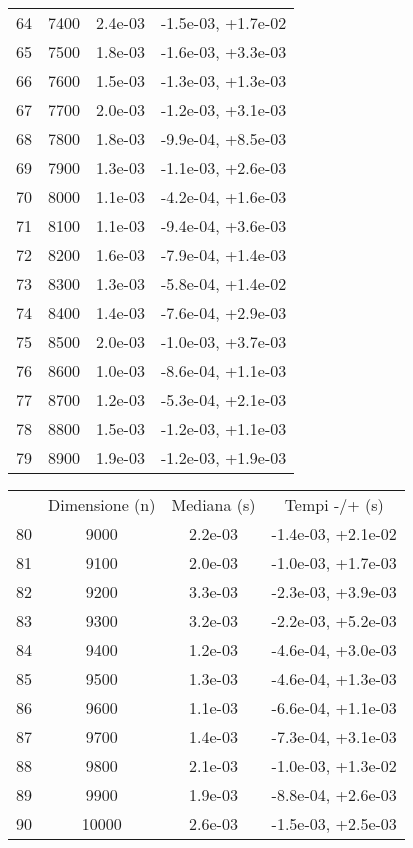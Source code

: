 \begin{table}
\begin{adjustbox}{width=1\textwidth/2}
\begin{tabular}{|c|c|c|c|}
\cline{1-4}
64 & 7400 & 2.4e-03 & -1.5e-03, +1.7e-02 \\
\cline{1-4}
65 & 7500 & 1.8e-03 & -1.6e-03, +3.3e-03 \\
\cline{1-4}
66 & 7600 & 1.5e-03 & -1.3e-03, +1.3e-03 \\
\cline{1-4}
67 & 7700 & 2.0e-03 & -1.2e-03, +3.1e-03 \\
\cline{1-4}
68 & 7800 & 1.8e-03 & -9.9e-04, +8.5e-03 \\
\cline{1-4}
69 & 7900 & 1.3e-03 & -1.1e-03, +2.6e-03 \\
\cline{1-4}
70 & 8000 & 1.1e-03 & -4.2e-04, +1.6e-03 \\
\cline{1-4}
71 & 8100 & 1.1e-03 & -9.4e-04, +3.6e-03 \\
\cline{1-4}
72 & 8200 & 1.6e-03 & -7.9e-04, +1.4e-03 \\
\cline{1-4}
73 & 8300 & 1.3e-03 & -5.8e-04, +1.4e-02 \\
\cline{1-4}
74 & 8400 & 1.4e-03 & -7.6e-04, +2.9e-03 \\
\cline{1-4}
75 & 8500 & 2.0e-03 & -1.0e-03, +3.7e-03 \\
\cline{1-4}
76 & 8600 & 1.0e-03 & -8.6e-04, +1.1e-03 \\
\cline{1-4}
77 & 8700 & 1.2e-03 & -5.3e-04, +2.1e-03 \\
\cline{1-4}
78 & 8800 & 1.5e-03 & -1.2e-03, +1.1e-03 \\
\cline{1-4}
79 & 8900 & 1.9e-03 & -1.2e-03, +1.9e-03 \\
\cline{1-4}
\end{tabular}
\end{adjustbox}
\end{table}

\begin{table}
\centering
\begin{adjustbox}{width=1\textwidth/2}
\begin{tabular}{|c|c|c|c|}
\hline
 & Dimensione (n) & Mediana (s) & Tempi -/+ (s) \\
80 & 9000 & 2.2e-03 & -1.4e-03, +2.1e-02 \\
\cline{1-4}
81 & 9100 & 2.0e-03 & -1.0e-03, +1.7e-03 \\
\cline{1-4}
82 & 9200 & 3.3e-03 & -2.3e-03, +3.9e-03 \\
\cline{1-4}
83 & 9300 & 3.2e-03 & -2.2e-03, +5.2e-03 \\
\cline{1-4}
84 & 9400 & 1.2e-03 & -4.6e-04, +3.0e-03 \\
\cline{1-4}
85 & 9500 & 1.3e-03 & -4.6e-04, +1.3e-03 \\
\cline{1-4}
86 & 9600 & 1.1e-03 & -6.6e-04, +1.1e-03 \\
\cline{1-4}
87 & 9700 & 1.4e-03 & -7.3e-04, +3.1e-03 \\
\cline{1-4}
88 & 9800 & 2.1e-03 & -1.0e-03, +1.3e-02 \\
\cline{1-4}
89 & 9900 & 1.9e-03 & -8.8e-04, +2.6e-03 \\
\cline{1-4}
90 & 10000 & 2.6e-03 & -1.5e-03, +2.5e-03 \\
\cline{1-4}
\end{tabular}
\end{adjustbox}
\end{table}

